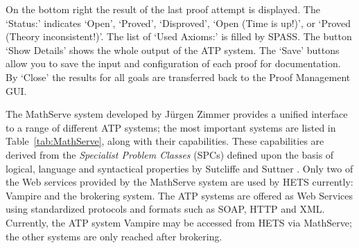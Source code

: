 \documentclass{article}
\newcommand{\normalTEXTSC}[2]{{#1\scriptsize#2}}
\newcommand     {\Hets}{\normalTEXTSC{H}{ETS}\xspace}
\newcommand     {\SPASS}{\normalTEXTSC{S}{PASS}\xspace}
\begin{document}
On the bottom right the result of the last proof
attempt is displayed.  The `Status:' indicates `Open', `Proved', `Disproved',
`Open (Time is up!)', or `Proved (Theory inconsistent!)'. The list of `Used
Axioms:' is filled by \SPASS. The button `Show Details' shows the whole output
of the ATP system. The `Save' buttons allow you to save the input and
configuration of each proof for documentation. By `Close' the results for all
goals are transferred back to the Proof Management GUI.

The MathServe system \cite{ZimmerAutexier06} developed by J\"{u}rgen
Zimmer provides a unified interface to a range of different ATP
systems; the most important systems are listed in
Table~\ref{tab:MathServe}, along with their capabilities. These
capabilities are derived from the \emph{Specialist Problem Classes}
(SPCs) defined upon the basis of logical, language and syntactical
properties by Sutcliffe and Suttner \cite{SutcliffeEA:2001:EvalATP}.
Only two of the Web services provided by the MathServe system are used
by \Hets currently: Vampire and the brokering system.  The ATP systems
are offered as Web Services using standardized protocols and formats
such as SOAP, HTTP and XML.  Currently, the ATP system Vampire may be
accessed from \Hets via MathServe; the other systems are only reached
after brokering.
\end{document}
